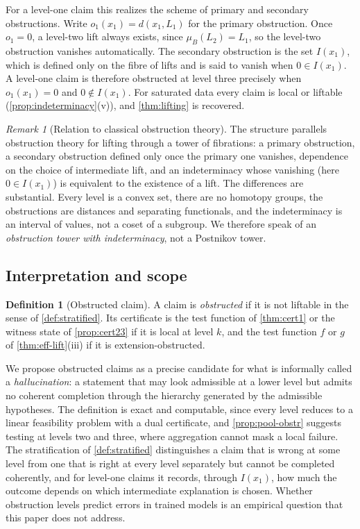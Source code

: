 \documentclass[11pt]{article}
\theoremstyle{definition}
\newtheorem{definition}[theorem]{Definition}
\theoremstyle{remark}
\newtheorem{remark}[theorem]{Remark}
\begin{document}
For a level-one claim this realizes the scheme of primary and secondary obstructions. Write
$o_1(x_1)=d(x_1,L_1)$ for the primary obstruction. Once $o_1=0$, a level-two lift always exists, since
$\mu_B(L_2)=L_1$, so the level-two obstruction vanishes automatically. The secondary obstruction is the
set $I(x_1)$, which is defined only on the fibre of lifts and is said to vanish when $0\in I(x_1)$. A
level-one claim is therefore obstructed at level three precisely when $o_1(x_1)=0$ and $0\notin
I(x_1)$. For saturated data every claim is local or liftable (\cref{prop:indeterminacy}(v)), and
\cref{thm:lifting} is recovered.

\begin{remark}[Relation to classical obstruction theory]\label{rem:obstruction-analogy}
The structure parallels obstruction theory for lifting through a tower of fibrations: a primary
obstruction, a secondary obstruction defined only once the primary one vanishes, dependence on the
choice of intermediate lift, and an indeterminacy whose vanishing (here $0\in I(x_1)$) is equivalent to
the existence of a lift. The differences are substantial. Every level is a convex set, there are no
homotopy groups, the obstructions are distances and separating functionals, and the indeterminacy is
an interval of values, not a coset of a subgroup. We therefore speak of an \emph{obstruction tower
with indeterminacy}, not a Postnikov tower.
\end{remark}

\subsection{Interpretation and scope}

\begin{definition}[Obstructed claim]
A claim is \emph{obstructed} if it is not liftable in the sense of \cref{def:stratified}. Its
certificate is the test function of \cref{thm:cert1} or the witness state of \cref{prop:cert23} if it
is local at level $k$, and the test function $f$ or $g$ of \cref{thm:eff-lift}(iii) if it is
extension-obstructed.
\end{definition}

We propose obstructed claims as a precise candidate for what is informally called a
\emph{hallucination}: a statement that may look admissible at a lower level but admits no coherent
completion through the hierarchy generated by the admissible hypotheses. The definition is exact
and computable, since every level reduces to a linear feasibility problem with a dual certificate,
and \cref{prop:pool-obstr} suggests testing at levels two and three, where aggregation cannot mask a
local failure. The stratification of \cref{def:stratified} distinguishes a claim that is wrong at some
level from one that is right at every level separately but cannot be completed coherently, and for
level-one claims it records, through $I(x_1)$, how much the outcome depends on which intermediate
explanation is chosen. Whether obstruction levels predict errors in trained models is an empirical question that
this paper does not address.
\end{document}
